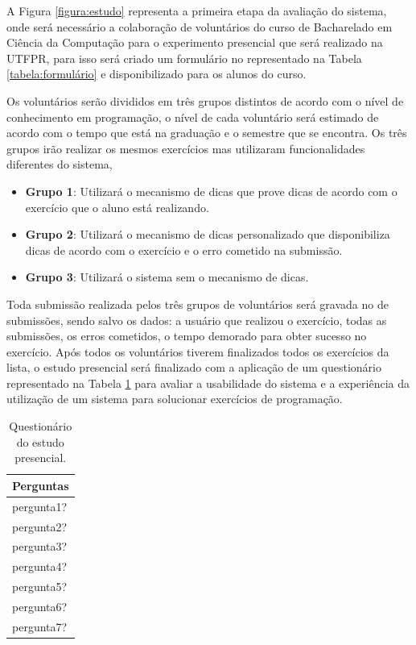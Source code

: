 A Figura \ref{figura:estudo} representa a primeira etapa da avaliação do sistema, onde será necessário a colaboração de voluntários do curso de Bacharelado em Ciência da Computação para o experimento presencial que será realizado na UTFPR, para isso será criado um formulário no  representado na Tabela \ref{tabela:formulário} e disponibilizado  para os alunos do curso.

Os voluntários serão divididos em três grupos distintos de acordo com o nível de conhecimento em programação, o nível de cada voluntário será estimado de acordo com o tempo que está na graduação e o semestre que se encontra. Os três grupos irão realizar os mesmos exercícios mas utilizaram funcionalidades diferentes do sistema,  

\begin{itemize}
	\item \textbf{Grupo 1}: Utilizará o mecanismo de dicas que prove dicas de acordo com o exercício que o aluno está realizando.
	
	\item \textbf{Grupo 2}: Utilizará o mecanismo de dicas personalizado que disponibiliza dicas de acordo com o exercício e o erro cometido na submissão.

	\item \textbf{Grupo 3}: Utilizará o sistema sem o mecanismo de dicas.
\end{itemize}

Toda submissão realizada pelos três grupos de voluntários será gravada no  de submissões, sendo salvo os dados: a usuário que realizou o exercício, todas as submissões, os erros cometidos, o tempo demorado para obter sucesso no exercício. Após todos os voluntários tiverem finalizados todos os exercícios da lista, o estudo presencial será finalizado com a aplicação de um questionário representado na Tabela \ref{tabela:questionárioestudo} para avaliar a usabilidade do sistema e a experiência da utilização de um sistema  para solucionar exercícios de programação.

\begin{table}[]
	\centering
	\captionsetup{justification=centering}
	\caption{Questionário do estudo presencial.}
	\label{tabela:questionárioestudo}
	\begin{tabular}{l}
		\hline
		Perguntas                        \\ \hline
		pergunta1?                            \\
		pergunta2?                           \\
		pergunta3?                        \\
		pergunta4?                           \\
		pergunta5?                           \\
		pergunta6? \\
		pergunta7?                        \\ \hline
	\end{tabular}
\end{table}

